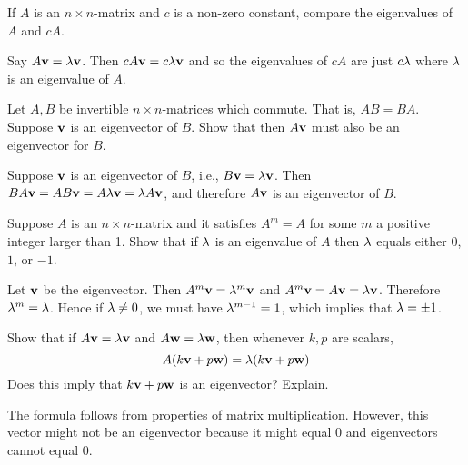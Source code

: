 \begin{ex}
  If $A$ is an $n\times n$-matrix and $c$ is a non-zero constant,
  compare the eigenvalues of $A$ and $cA$.
  \begin{sol}
    Say $A\vect{v}=\eigenvar \vect{v}$. Then
    $ cA\vect{v}=c\eigenvar \vect{v}$ and so the eigenvalues of $cA$ are
    just $ c\lambda $ where $\lambda $ is an eigenvalue of $A$.
  \end{sol}
\end{ex}

\begin{ex}
  Let $A,B$ be invertible $n\times n$-matrices which commute. That is,
  $AB=BA$. Suppose $\vect{v}$ is an eigenvector of $B$. Show that then
  $A\vect{v}$ must also be an eigenvector for $B$.
  \begin{sol}
    Suppose $\vect{v}$ is an eigenvector of $B$, i.e.,
    $B\vect{v}=\eigenvar \vect{v}$. Then
    $BA\vect{v}=AB\vect{v} =A\eigenvar \vect{v}=\eigenvar A\vect{v}$,
    and therefore $A\vect{v}$ is an eigenvector of $B$.
  \end{sol}
\end{ex}

\begin{ex}
  Suppose $A$ is an $n\times n$-matrix and it satisfies $A^m=A$ for
  some $m$ a positive integer larger than 1. Show that if $\lambda $
  is an eigenvalue of $A$ then $\lambda$ equals either $0$, $1$, or
  $-1$.
  \begin{sol}
    Let $\vect{v}$ be the eigenvector. Then
    $A^m\vect{v}=\eigenvar^m\vect{v}$ and
    $A^m\vect{v}=A\vect{v}=\eigenvar\vect{v}$. Therefore
    $\lambda^m=\lambda$. Hence if $\lambda \neq 0$, we must
    have $\lambda^{m-1}=1$, which implies that $\lambda=\pm 1$.
  \end{sol}
\end{ex}

\begin{ex}
  Show that if $A\vect{v}=\eigenvar \vect{v}$ and
  $A\vect{w}=\eigenvar \vect{w}$, then whenever $k,p$ are scalars,
  \begin{equation*}
    A(k\vect{v}+p\vect{w}) =\eigenvar (k\vect{v}+p\vect{w})
  \end{equation*}
  Does this imply that $k\vect{v}+p\vect{w}$ is an eigenvector? Explain.
  \begin{sol}
    The formula follows from properties of matrix
    multiplication. However, this vector might not be an eigenvector
    because it might equal $0$ and eigenvectors cannot equal $0$.
  \end{sol}
\end{ex}


